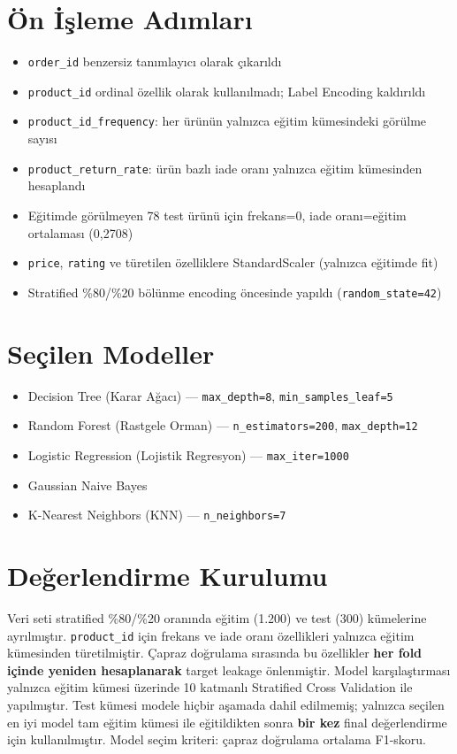 \documentclass[12pt,a4paper]{report}
\begin{document}
\chapter{Ön İşleme Adımları}
\begin{itemize}
    \item \texttt{order\_id} benzersiz tanımlayıcı olarak çıkarıldı
    \item \texttt{product\_id} ordinal özellik olarak kullanılmadı; Label Encoding kaldırıldı
    \item \texttt{product\_id\_frequency}: her ürünün yalnızca eğitim kümesindeki görülme sayısı
    \item \texttt{product\_return\_rate}: ürün bazlı iade oranı yalnızca eğitim kümesinden hesaplandı
    \item Eğitimde görülmeyen 78 test ürünü için frekans=0, iade oranı=eğitim ortalaması (0,2708)
    \item \texttt{price}, \texttt{rating} ve türetilen özelliklere StandardScaler (yalnızca eğitimde fit)
    \item Stratified \%80/\%20 bölünme encoding öncesinde yapıldı (\texttt{random\_state=42})
\end{itemize}

\chapter{Seçilen Modeller}
\begin{itemize}
    \item Decision Tree (Karar Ağacı) --- \texttt{max\_depth=8}, \texttt{min\_samples\_leaf=5}
    \item Random Forest (Rastgele Orman) --- \texttt{n\_estimators=200}, \texttt{max\_depth=12}
    \item Logistic Regression (Lojistik Regresyon) --- \texttt{max\_iter=1000}
    \item Gaussian Naive Bayes
    \item K-Nearest Neighbors (KNN) --- \texttt{n\_neighbors=7}
\end{itemize}

\chapter{Değerlendirme Kurulumu}
Veri seti stratified \%80/\%20 oranında eğitim (1.200) ve test (300) kümelerine ayrılmıştır.
\texttt{product\_id} için frekans ve iade oranı özellikleri yalnızca eğitim kümesinden türetilmiştir.
Çapraz doğrulama sırasında bu özellikler \textbf{her fold içinde yeniden hesaplanarak} target leakage önlenmiştir.
Model karşılaştırması yalnızca eğitim kümesi üzerinde 10 katmanlı Stratified Cross Validation ile yapılmıştır.
Test kümesi modele hiçbir aşamada dahil edilmemiş; yalnızca seçilen en iyi model tam eğitim kümesi ile eğitildikten sonra \textbf{bir kez} final değerlendirme için kullanılmıştır.
Model seçim kriteri: çapraz doğrulama ortalama F1-skoru.
\end{document}
